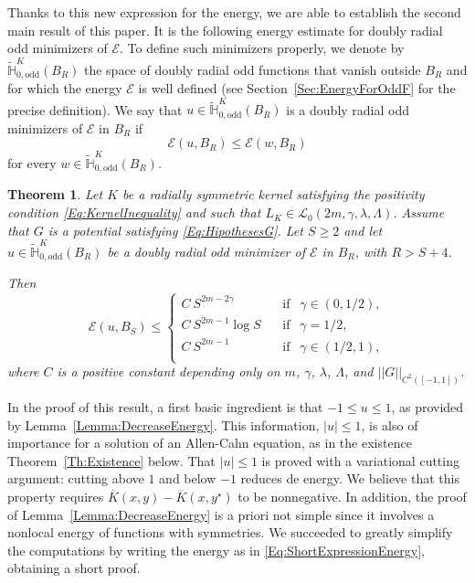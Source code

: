 \documentclass[12pt,reqno]{amsart}
\newtheorem{theorem}{Theorem}[section]
\theoremstyle{definition}
\theoremstyle{remark}
\newcommand{\con}[1]{\mathbb{#1}}
\renewcommand{\H}{\con{H}}
\newcommand{\ecal}{\mathcal{E}}
\newcommand{\lcal}{\mathcal{L}}
\newcommand{\norm}[1]{\left | \left |{#1} \right | \right |}
\newcommand{\s}{\gamma}
\numberwithin{equation}{section}
\begin{document}
	
	
	Thanks to this new expression for the energy, we are able to establish the second main result of this paper. It is the following energy estimate for doubly radial odd minimizers of $\ecal$. To define such minimizers properly, we denote by $\widetilde{\H}^K_{0, \mathrm{odd}}(B_R)$ the space of doubly radial odd functions that vanish outside $B_R$ and for which the energy $\ecal$ is well defined (see Section~\ref{Sec:EnergyForOddF} for the precise definition). We say that $u\in \widetilde{\H}^K_{0, \mathrm{odd}}(B_R)$ is a doubly radial odd minimizers of $\ecal$ in $B_R$ if
	$$
	\ecal(u,B_R) \leq \ecal (w,B_R)
	$$
	for every $w\in \widetilde{\H}^K_{0, \mathrm{odd}}(B_R)$. 
	
	\begin{theorem}
		\label{Th:EnergyEstimate} 
		Let $K$ be a radially symmetric kernel satisfying the positivity condition \eqref{Eq:KernelInequality} and such that $L_K\in \lcal_0(2m, \s, \lambda, \Lambda)$. Assume that $G$ is a potential satisfying \eqref{Eq:HipothesesG}. Let $S\geq2$ and let $u\in \widetilde{\H}^K_{0, \mathrm{odd}}(B_R)$ be a doubly radial odd minimizer of $\ecal$ in $B_R$, with $R>S+4$. 
		
		Then
		\begin{equation}
		\label{Eq:EnergyEstimate} 
		\ecal (u,B_S) \leq 
		\begin{cases}
		C \ S^{2m-2\s}\ \ \ \ &\textrm{if } \ \ \s\in(0,1/2),\\
		C \ S^{2m-1} \log S\ \ \ \ &\textrm{if } \ \ \s=1/2,\\
		C \ S^{2m-1}\ \ \ \ &\textrm{if } \ \ \s\in(1/2,1),\\
		\end{cases}
		\end{equation}
		where $C$ is a positive constant depending only on $m$, $\s$, $\lambda$, $\Lambda$, and $\norm{G}_{C^2([-1,1])}$.
	\end{theorem}
	
	
	In the proof of this result, a first basic ingredient is that $-1\leq u\leq 1$, as provided by Lemma~\ref{Lemma:DecreaseEnergy}. This information, $|u|\leq 1$, is also of importance for a solution of an Allen-Cahn equation, as in the existence Theorem~\ref{Th:Existence} below. That $|u|\leq 1$ is proved with a variational cutting argument: cutting above $1$ and below $-1$ reduces de energy. We believe that this property requires $\overline{K}(x,y)- \overline{K}(x,y^\star)$ to be nonnegative. In addition, the proof of Lemma~\ref{Lemma:DecreaseEnergy} is a priori not simple since it involves a nonlocal energy of functions with symmetries. We succeeded to greatly simplify the computations by writing the energy as in \eqref{Eq:ShortExpressionEnergy}, obtaining a short proof.
	
\end{document}
